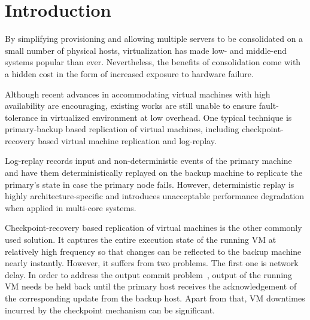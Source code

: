 \section{Introduction} \label{sec:intro}

By simplifying provisioning and allowing multiple servers to be consolidated on a 
small number of physical hosts, virtualization has made low- and middle-end systems 
popular than ever. Nevertheless, the benefits of consolidation come with a hidden cost 
in the form of increased exposure to hardware failure. 

Although recent advances in accommodating virtual machines with high availability 
are encouraging, existing works are still unable to ensure fault-tolerance in virtualized 
environment at low overhead. One typical technique is primary-backup based replication of 
virtual machines, including checkpoint-recovery based virtual machine replication and log-replay.



Log-replay records input and non-deterministic events of the primary machine 
and have them deterministically replayed on the backup machine to replicate the primary's state 
in case the primary node fails. However, deterministic replay is highly architecture-specific and 
introduces unacceptable performance degradation when applied in multi-core systems.

Checkpoint-recovery based replication of virtual machines is the other commonly used solution. 
It captures the entire execution state of the running VM at relatively high frequency so that changes 
can be reflected to the backup machine nearly instantly. However, it suffers from two problems. 
The first one is network delay. In order to address the output commit problem~\cite{mediatomb}, 
output of the running VM needs be held back until the primary host receives the acknowledgement of 
the corresponding update from the backup host. Apart from that, VM downtimes incurred by the 
checkpoint mechanism can be significant.

